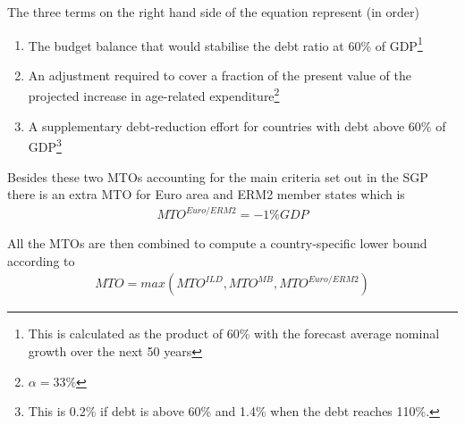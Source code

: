 \documentclass{tufte-handout}
\begin{document}
The three terms on the right hand side of the equation represent (in order)
\begin{enumerate}
  \item The budget balance that would stabilise the debt ratio at 60\% of GDP\footnote{This is calculated as the product of 60\% with the forecast  average  nominal  growth  over  the  next  50 years}
  \item An adjustment required to cover a fraction of the present value of the projected increase in age-related expenditure\footnote{$\alpha=33\%$}
  \item A supplementary debt-reduction effort for countries with debt above 60\% of GDP\footnote{This is 0.2\% if debt is above 60\% and 1.4\% when the debt reaches 110\%.}
\end{enumerate}

Besides these two MTOs accounting for the main criteria set out in the SGP there is an extra MTO for Euro area and ERM2 member states which is
\begin{align*}
  MTO^{Euro/ERM2}=-1\% GDP
\end{align*}

All the MTOs are then combined to compute a country-specific lower bound according to
\begin{align*}
  MTO = max (MTO^{ILD},MTO^{MB},MTO^{Euro/ERM2})
\end{align*}
\end{document}
